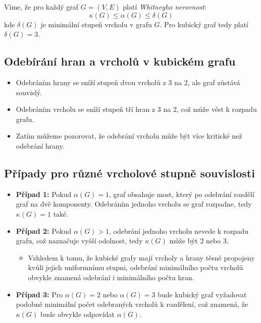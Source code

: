 \documentclass[10pt, a4paper]{ReportSheet}
\begin{document}

    Víme, že pro každý graf $G=(V, E)$ platí \textit{Whitneyho nerovnost}:
    \begin{equation*}
        \kappa(G) \leq \alpha(G) \leq \delta(G)
    \end{equation*}
    kde $\delta(G)$ je minimální stupeň vrcholu v grafu $G$. Pro kubický graf tedy platí $\delta(G) = 3$.

    \subsection{Odebírání hran a vrcholů v kubickém grafu}
    \begin{itemize}
        \item Odebráním hrany se sníží stupeň dvou vrcholů z 3 na 2, ale graf zůstává souvislý.
        \item Odebráním vrcholu se sníží stupeň tří hran z 3 na 2, což může vést k rozpadu grafu.
        \item Zatím můžeme pozorovat, že odebrání vrcholu může být více kritické než odebrání hrany.
    \end{itemize}

    \subsection{Případy pro různé vrcholové stupně souvislosti}
    \begin{itemize}
        \item \textbf{Případ 1:} Pokud $\alpha(G) = 1$, graf obsahuje most, který po odebrání rozdělí graf na dvě
        komponenty. Odebráním jednoho vrcholu se graf rozpadne, tedy $\kappa(G) = 1$ také.
        \item \textbf{Případ 2:} Pokud $\alpha(G) > 1$, odebrání jednoho vrcholu nevede k rozpadu grafu, což naznačuje vyšší odolnost, tedy $\kappa(G)$ může být 2 nebo 3.
        \begin{itemize}
            \item Vzhledem k tomu, že kubické grafy mají vrcholy a hrany těsně propojeny kvůli jejich uniformnímu stupni, odebrání minimálního počtu vrcholů obvykle znamená odebrání i minimálního počtu hran.
        \end{itemize}
        \item \textbf{Případ 3:} Pro $\alpha(G) = 2$ nebo $\alpha(G) = 3$ bude kubický graf vyžadovat podobně minimální počet odebraných vrcholů k rozdělení, což znamená, že $\kappa(G)$ bude obvykle odpovídat $\alpha(G)$.
    \end{itemize}
\end{document}

